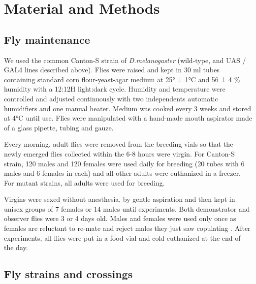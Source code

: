 \documentclass[a4paper, 12pt]{article}
\begin{document}
	
	

	

	\section{Material and Methods}
	
	\bigskip

	\subsection{Fly maintenance}
	
	We used the common Canton-S strain of \textit{D.melanogaster} (wild-type, and UAS / GAL4 lines described above). Flies were raised and kept in 30 ml tubes containing standard corn flour-yeast-agar medium at 25° ± 1°C and 56 ± 4 \% humidity with a 12:12H light:dark cycle. Humidity and temperature were controlled and adjusted continuously with two independents automatic humidifiers and one manual heater. Medium was cooked every 3 weeks and stored at 4°C until use. Flies were manipulated with a hand-made mouth aspirator made of a glass pipette, tubing and gauze.
	
	Every morning, adult flies were removed from the breeding vials so that the newly emerged flies collected within the 6-8 hours were virgin. For Canton-S strain, 120 males and 120 females were used daily for breeding (20 tubes with 6 males and 6 females in each) and all other adults were euthanized in a freezer. For mutant strains, all adults were used for breeding. 
	
	Virgins were sexed without anesthesia, by gentle aspiration and then kept in unisex groups of 7 females or 14 males until experiments. Both demonstrator and observer flies were 3 or 4 days old. Males and females were used only once as females are reluctant to re-mate \parencite{chapman_sex_2003} and reject males they just saw copulating \parencite{loyau_when_2012}. After experiments, all flies were put in a food vial and cold-euthanized at the end of the day.
	
	\subsection{Fly strains and crossings}
	
\end{document}
